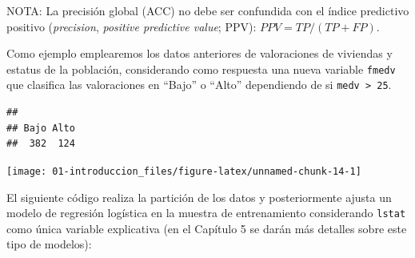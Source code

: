 \documentclass[]{book}
\newenvironment{Shaded}{\begin{snugshade}}{\end{snugshade}}
\newcommand{\KeywordTok}[1]{\textcolor[rgb]{0.13,0.29,0.53}{\textbf{#1}}}
\newcommand{\DataTypeTok}[1]{\textcolor[rgb]{0.13,0.29,0.53}{#1}}
\newcommand{\DecValTok}[1]{\textcolor[rgb]{0.00,0.00,0.81}{#1}}
\newcommand{\StringTok}[1]{\textcolor[rgb]{0.31,0.60,0.02}{#1}}
\newcommand{\CommentTok}[1]{\textcolor[rgb]{0.56,0.35,0.01}{\textit{#1}}}
\newcommand{\OtherTok}[1]{\textcolor[rgb]{0.56,0.35,0.01}{#1}}
\newcommand{\OperatorTok}[1]{\textcolor[rgb]{0.81,0.36,0.00}{\textbf{#1}}}
\newcommand{\NormalTok}[1]{#1}
\theoremstyle{break}
\theoremstyle{definition}
\theoremstyle{definition}
\theoremstyle{definition}
\theoremstyle{remark}
\begin{document}
NOTA: La precisión global (ACC) no debe ser confundida con el índice
predictivo positivo (\emph{precision}, \emph{positive predictive value};
PPV): \(PPV = TP/(TP+FP)\).

Como ejemplo emplearemos los datos anteriores de valoraciones de
viviendas y estatus de la población, considerando como respuesta una
nueva variable \texttt{fmedv} que clasifica las valoraciones en ``Bajo''
o ``Alto'' dependiendo de si \texttt{medv\ \textgreater{}\ 25}.

\begin{Shaded}
\end{Shaded}

\begin{verbatim}
## 
## Bajo Alto 
##  382  124
\end{verbatim}

\begin{Shaded}
\end{Shaded}

\begin{center}\texttt{[image: 01-introduccion\_files/figure-latex/unnamed-chunk-14-1]} \end{center}

El siguiente código realiza la partición de los datos y posteriormente
ajusta un modelo de regresión logística en la muestra de entrenamiento
considerando \texttt{lstat} como única variable explicativa (en el
Capítulo 5 se darán más detalles sobre este tipo de modelos):
\end{document}
